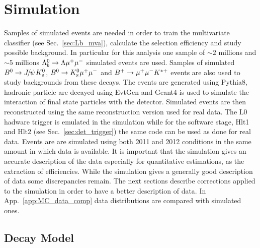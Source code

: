 \section{Simulation}
\label{sec:Lb_simulation}

Samples of simulated events are needed in order to train the multivariate classifier
(see Sec.~\ref{sec:Lb_mva}), calculate the selection efficiency and study possible background.
In particular for this analysis one sample of $\sim 2$ millions \Lb\to\jpsi\Lz and 
$\sim 5$ millions ${{\Lambda}^0_{b}}\rightarrow{\ensuremath{\Lambda}}{\ensuremath{\mu^+\mu^-}}$ simulated events are used.
Samples of simulated $\Bz\ra\jpsi\KS$, ${{B}^0}\rightarrow{\ensuremath{{K}^0_{\rm\scriptscriptstyle S}}}{\ensuremath{\mu^+\mu^-}}$ and $B^{+} \rightarrow{\ensuremath{\mu^+\mu^-}} K^{*+}$
events are also used to study backgrounds from these decays. The events are generated using
Pythia8, hadronic particle are decayed using EvtGen and Geant4 is used to simulate
the interaction of final state particles with the detector. Simulated events are then
reconstructed using the same reconstruction version used for real data. The L0 hadware
trigger is emulated in the simulation while for the software stage, Hlt1 and Hlt2
(see Sec.~\ref{sec:det_trigger}) the same code can be used as done for real data.
Events are are simulated using both 2011 and 2012 conditions in the same amount in which data is available.
It is important that the simulation gives an accurate description of the data especially
for quantitative estimations, as the extraction of efficiencies. While the simulation
gives a generally good description of data some discrepancies remain. The next sections
describe corrections applied to the simulation in order to have a better description of data.
In App.~\ref{app:MC_data_comp} data distributions are compared with simulated ones.

\subsection{Decay Model}
\label{decaymodel}

